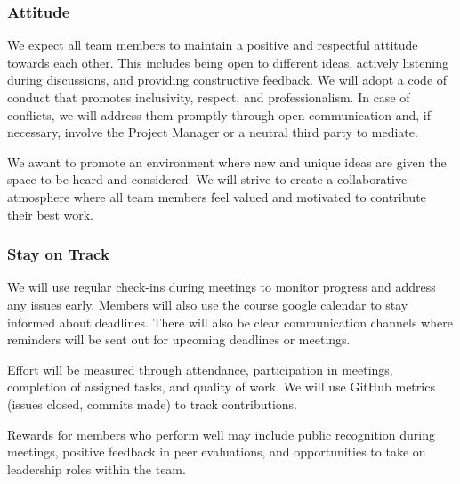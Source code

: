 \documentclass{article}
\begin{document}
\begin{enumerate}
\subsubsection*{Attitude}


We expect all team members to maintain a positive and respectful attitude towards each other. This includes being open to different ideas, actively listening during discussions, and providing constructive feedback.
We will adopt a code of conduct that promotes inclusivity, respect, and professionalism. In case of conflicts, we will address them promptly through open communication and, if necessary, involve the Project Manager or a neutral third party to mediate.

We awant to promote an environment where new and unique ideas are given the space to be heard and considered. We will strive to create a collaborative atmosphere where all team members feel valued and motivated to contribute their best work.

\subsubsection*{Stay on Track}


We will use regular check-ins during meetings to monitor progress and address any issues early. Members will also use the course google calendar to stay informed about deadlines. There will also be clear communication channels where reminders will be sent out for upcoming deadlines or meetings.

Effort will be measured through attendance, participation in meetings, completion of assigned tasks, and quality of work. We will use GitHub metrics (issues closed, commits made) to track contributions.

Rewards for members who perform well may include public recognition during meetings, positive feedback in peer evaluations, and opportunities to take on leadership roles within the team.


\end{enumerate}
\end{document}
